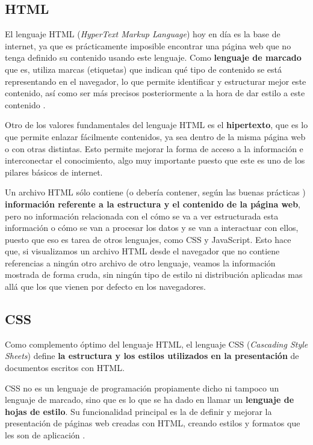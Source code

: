 
\subsection{HTML}

El lenguaje HTML (\textit{HyperText Markup Language}) hoy en día es la base de internet, ya que es prácticamente imposible encontrar una página web que no tenga definido su contenido usando este lenguaje. Como \textbf{lenguaje de marcado} que es, utiliza marcas (etiquetas) que indican qué tipo de contenido se está representando en el navegador, lo que permite identificar y estructurar mejor este contenido, así como ser más precisos posteriormente a la hora de dar estilo a este contenido \cite{mdn:html}.

Otro de los valores fundamentales del lenguaje HTML es el \textbf{hipertexto}, que es lo que permite enlazar fácilmente contenidos, ya sea dentro de la misma página web o con otras distintas. Esto permite mejorar la forma de acceso a la información e interconectar el conocimiento, algo muy importante puesto que este es uno de los pilares básicos de internet.

Un archivo HTML sólo contiene (o debería contener, según las buenas prácticas \cite{midudev:html}) \textbf{información referente a la estructura y el contenido de la página web}, pero no información relacionada con el cómo se va a ver estructurada esta información o cómo se van a procesar los datos y se van a interactuar con ellos, puesto que eso es tarea de otros lenguajes, como CSS y JavaScript. Esto hace que, si visualizamos un archivo HTML desde el navegador que no contiene referencias a ningún otro archivo de otro lenguaje, veamos la información mostrada de forma cruda, sin ningún tipo de estilo ni distribución aplicadas mas allá que los que vienen por defecto en los navegadores.

\subsection{CSS}

Como complemento óptimo del lenguaje HTML, el lenguaje CSS (\textit{Cascading Style Sheets}) define \textbf{la estructura y los estilos utilizados en la presentación} de documentos escritos con HTML.

CSS no es un lenguaje de programación propiamente dicho ni tampoco un lenguaje de marcado, sino que es lo que se ha dado en llamar un \textbf{lenguaje de hojas de estilo}. Su funcionalidad principal es la de definir y mejorar la presentación de páginas web creadas con HTML, creando estilos y formatos que les son de aplicación \cite{mdn:css}.


